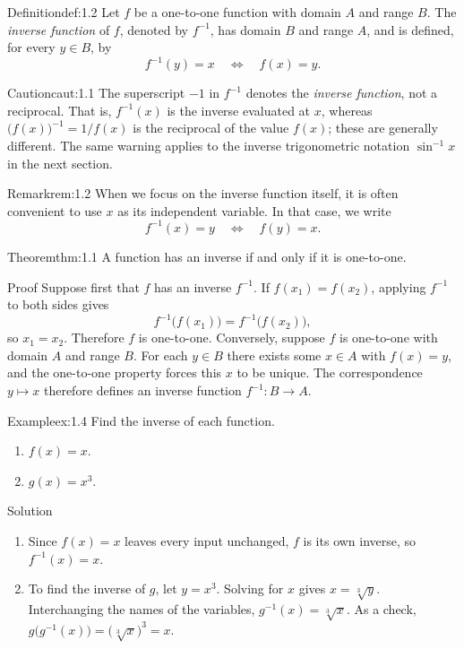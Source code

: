 \documentclass[a4paper,12pt,oneside]{memoir}
\begin{document}
\begin{envdefinition}{Definition}{def:1.2}{}
Let \(f\) be a one-to-one function with domain \(A\) and range \(B\). The \emph{inverse function} of \(f\), denoted by \(f^{-1}\), has domain \(B\) and range \(A\), and is defined, for every \(y \in B\), by \[ f^{-1}(y) = x \quad \Longleftrightarrow \quad f(x) = y. \]
\end{envdefinition}
\begin{envcaution}{Caution}{caut:1.1}{}
The superscript \(-1\) in \(f^{-1}\) denotes the \emph{inverse function}, not a reciprocal. That is, \(f^{-1}(x)\) is the inverse evaluated at \(x\), whereas \(\bigl(f(x)\bigr)^{-1} = 1 / f(x)\) is the reciprocal of the value \(f(x)\); these are generally different. The same warning applies to the inverse trigonometric notation \(\sin^{-1} x\) in the next section.
\end{envcaution}
\begin{envremark}{Remark}{rem:1.2}{}
When we focus on the inverse function itself, it is often convenient to use \(x\) as its independent variable. In that case, we write \[ f^{-1}(x) = y \quad \Longleftrightarrow \quad f(y) = x. \]
\end{envremark}
\pagebreakbefore
\begin{envtheorem}{Theorem}{thm:1.1}{}
A function has an inverse if and only if it is one-to-one.
\end{envtheorem}
\begin{envproof}{Proof}{}{}
Suppose first that \(f\) has an inverse \(f^{-1}\). If \(f(x_{1}) = f(x_{2})\), applying \(f^{-1}\) to both sides gives \[ f^{-1}\!\bigl(f(x_{1})\bigr) = f^{-1}\!\bigl(f(x_{2})\bigr), \] so \(x_{1} = x_{2}\). Therefore \(f\) is one-to-one. Conversely, suppose \(f\) is one-to-one with domain \(A\) and range \(B\). For each \(y \in B\) there exists some \(x \in A\) with \(f(x) = y\), and the one-to-one property forces this \(x\) to be unique. The correspondence \(y \mapsto x\) therefore defines an inverse function \(f^{-1} : B \to A\).
\end{envproof}
\begin{workedexample}
\begin{envexample}{Example}{ex:1.4}{}
Find the inverse of each function.

\begin{enumerate}
  \item \(f(x) = x\).
  \item \(g(x) = x^{3}\).
\end{enumerate}
\end{envexample}
\begin{envsolution}{Solution}{}{}
\begin{enumerate}
  \item Since \(f(x) = x\) leaves every input unchanged, \(f\) is its own inverse, so \(f^{-1}(x) = x\).
  \item To find the inverse of \(g\), let \(y = x^{3}\). Solving for \(x\) gives \(x = \sqrt[3]{y}\). Interchanging the names of the variables, \(g^{-1}(x) = \sqrt[3]{x}\). As a check, \(g\!\bigl(g^{-1}(x)\bigr) = \bigl(\sqrt[3]{x}\bigr)^{3} = x\).
\end{enumerate}
\end{envsolution}
\end{workedexample}
\end{document}
